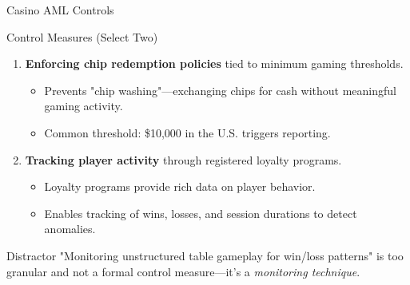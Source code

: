 \documentclass{beamer}
\begin{document}
	\begin{frame}{Casino AML Controls}
		\begin{block}{Control Measures (Select Two)}
			\begin{enumerate}
				\item \textbf{Enforcing chip redemption policies} tied to minimum gaming thresholds.
				\begin{itemize}
					\item Prevents "chip washing"—exchanging chips for cash without meaningful gaming activity.
					\item Common threshold: \$10,000 in the U.S. triggers reporting.
				\end{itemize}
				\item \textbf{Tracking player activity} through registered loyalty programs.
				\begin{itemize}
					\item Loyalty programs provide rich data on player behavior.
					\item Enables tracking of wins, losses, and session durations to detect anomalies.
				\end{itemize}
			\end{enumerate}
		\end{block}
		\begin{alertblock}{Distractor}
			"Monitoring unstructured table gameplay for win/loss patterns" is too granular and not a formal control measure—it's a \textit{monitoring technique}.
		\end{alertblock}
	\end{frame}
	
\end{document}
